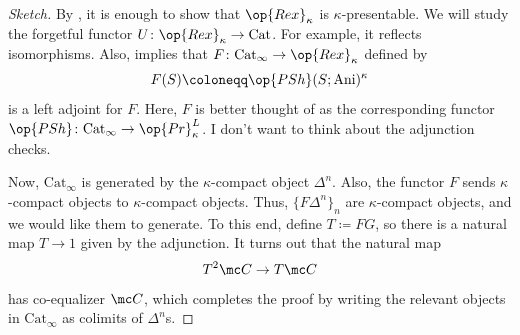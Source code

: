 \documentclass[../notes.tex]{subfiles}
\begin{document}
\begin{proof}[Sketch]
	By , it is enough to show that $\op{Rex}_\kappa$ is $\kappa$-presentable. We will study the forgetful functor $U\colon\op{Rex}_\kappa\to\mathrm{Cat}$. For example, it reflects isomorphisms. Also,  implies that $F\colon\mathrm{Cat}_\infty\to\op{Rex}_\kappa$ defined by
	\[F(S)\coloneqq\op{PSh}(S;\mathrm{Ani})^\kappa\]
	is a left adjoint for $F$. Here, $F$ is better thought of as the corresponding functor $\op{PSh}\colon\mathrm{Cat}_\infty\to\op{Pr}^L_\kappa$. I don't want to think about the adjunction checks.

	Now, $\mathrm{Cat}_\infty$ is generated by the $\kappa$-compact object $\Delta^n$. Also, the functor $F$ sends $\kappa$-compact objects to $\kappa$-compact objects. Thus, $\{F\Delta^n\}_n$ are $\kappa$-compact objects, and we would like them to generate. To this end, define $T\coloneqq FG$, so there is a natural map $T\to1$ given by the adjunction. It turns out that the natural map
	\[T^2\mc C\to T\mc C\]
	has co-equalizer $\mc C$, which completes the proof by writing the relevant objects in $\mathrm{Cat}_\infty$ as colimits of $\Delta^n$s.
\end{proof}
\end{document}
